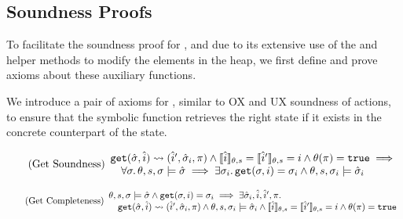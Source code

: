 \subsection{Soundness Proofs}

To facilitate the soundness proof for \PMap, and due to its extensive use of the  and  helper methods to modify the elements in the heap, we first define and prove axioms about these auxiliary functions.

We introduce a pair of axioms for , similar to OX and UX soundness of actions, to ensure that the symbolic function retrieves the right state if it exists in the concrete counterpart of the state. 

\begin{equation}
\tag{Get Soundness}\label{eq:get-sound}
\begin{array}{l}
\texttt{get}(\hat{\sigma},\hat{i})\rightsquigarrow(\hat{i}', \hat{\sigma}_i, \pi) \land \llbracket\hat{i}\rrbracket_{\theta,s}=\llbracket\hat{i}'\rrbracket_{\theta,s}=i \land \theta(\pi)=\texttt{true} \implies \\
\quad \forall \sigma\ldotp \theta,s,\sigma \models \hat{\sigma} \implies \exists \sigma_i \ldotp \texttt{get}(\sigma, i)=\sigma_i \land \theta,s,\sigma_i \models \hat{\sigma}_i
\end{array}
\end{equation}

\begin{equation}
\tag{Get Completeness}\label{eq:get-complete}
\begin{array}{l}
\theta,s,\sigma \models \hat{\sigma} \land \texttt{get}(\sigma, i)=\sigma_i \implies \exists \hat{\sigma}_i, \hat{i}, \hat{i}', \pi \ldotp \\
\quad \texttt{get}(\hat{\sigma},\hat{i})\rightsquigarrow(\hat{i}', \hat{\sigma}_i, \pi) \land \theta,s,\sigma_i\models\hat{\sigma}_i \land \llbracket\hat{i}\rrbracket_{\theta,s}=\llbracket\hat{i}'\rrbracket_{\theta,s}=i \land \theta(\pi)=\texttt{true}
\end{array}
\end{equation}


